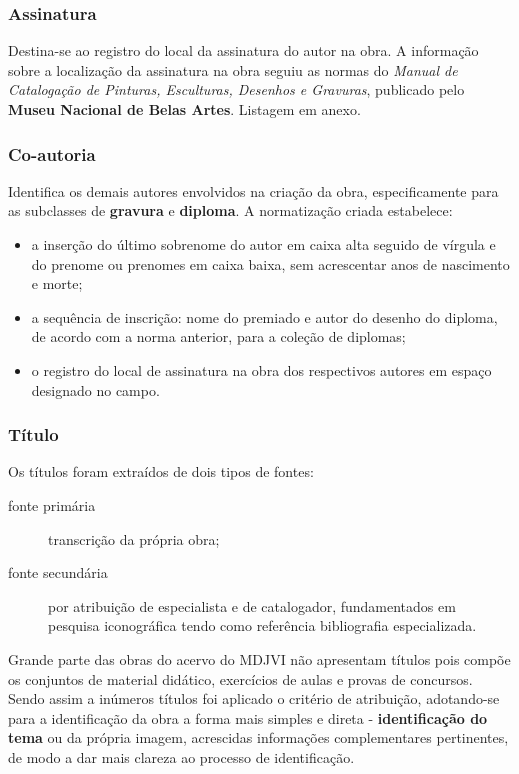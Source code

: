 \subsubsection{Assinatura}
Destina-se ao registro do local da assinatura do autor na obra. A informação sobre a localização da assinatura na obra seguiu as normas do \textit{Manual de Catalogação de Pinturas, Esculturas, Desenhos e Gravuras}, publicado pelo \textbf{Museu Nacional de Belas Artes}. Listagem em anexo.

\subsubsection{Co-autoria}
Identifica os demais autores envolvidos na criação da obra, especificamente para as subclasses de \textbf{gravura} e \textbf{diploma}. A normatização criada estabelece:
\begin{itemize}
	\item a inserção do último sobrenome do autor em caixa alta seguido de vírgula e do prenome ou prenomes em caixa baixa, sem acrescentar anos de nascimento e morte;
	\item a sequência de inscrição: nome do premiado e autor do desenho do diploma, de acordo com a norma anterior, para a coleção de diplomas;
	\item o registro do local de assinatura na obra dos respectivos autores em espaço designado no campo.
\end{itemize}

\subsubsection{Título}
Os títulos foram extraídos de dois tipos de fontes: 
\begin{description}
	\item[fonte primária ] transcrição da própria obra;  
	\item[fonte secundária] por atribuição de especialista e de catalogador, fundamentados em pesquisa iconográfica tendo como referência bibliografia especializada.
\end{description}

Grande parte das obras do acervo do MDJVI não apresentam títulos pois compõe os conjuntos de material didático, exercícios de aulas e provas de concursos. Sendo assim a inúmeros títulos foi aplicado o critério de atribuição, adotando-se para a identificação da obra a forma mais simples e direta - \textbf{identificação do tema} ou da própria imagem, acrescidas informações complementares pertinentes, de modo a dar mais clareza ao processo de identificação.

